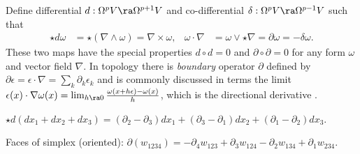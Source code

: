 \documentclass{juliacon}
\begin{document}
\begin{definition}
	Define differential $d:\Omega^p V\ra\Omega^{p+1}V$ and co-differential $\delta:\Omega^pV\ra\Omega^{p-1}V$ such that \cite{bishop-goldberg}
	\begin{align*}
		\star d\omega &= \star(\nabla\wedge\omega) = \nabla\times\omega, & \omega\cdot\nabla &= \omega\vee\star\nabla = \partial\omega =-\delta\omega.
	\end{align*}
	These two maps have the special properties $d\circ d=0$ and $\partial\circ\partial = 0$ for any form $\omega$ and vector field $\nabla$. 
	In topology there is \textit{boundary} operator $\partial$ defined by $\partial\epsilon = \epsilon\cdot\nabla = \sum_k\partial_k\epsilon_k$ and is commonly discussed in terms the limit $\epsilon(x)\cdot\nabla\omega(x) = \lim_{h\ra0} \frac{\omega(x+h\epsilon)-\omega(x)}{h}$, which is the directional derivative \cite{sobczyk}.
\end{definition}
\begin{example}
	$\star d(dx_1+dx_2+dx_3) = (∂_2 -∂_3)dx_1 + (∂_3 -∂_1)dx_2 + (∂_1 -∂_2)dx_3$.
\end{example}
\begin{example}
	Faces of simplex (oriented): $\partial(w_{1234}) = -\partial_4w_{123}+\partial_3w_{124}-\partial_2w_{134}+\partial_1w_{234}$.
\end{example}
\end{document}
